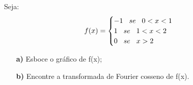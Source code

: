 \linespread{1.5}
Seja:
\begin{equation*}
    f(x) = \begin{cases}
    -1 \hspace{0.3cm} se \hspace{0.3cm} 0 < x < 1\\
    1 \hspace{0.3cm} se \hspace{0.3cm} 1 < x < 2\\
    0 \hspace{0.3cm} se \hspace{0.3cm} x > 2
    \end{cases}
\end{equation*}
\begin{itemize}
    \item[\textbf{a)}] Esboce o gráfico de f(x);
    \item[\textbf{b)}] Encontre a transformada de Fourier cosseno de f(x).
\end{itemize}